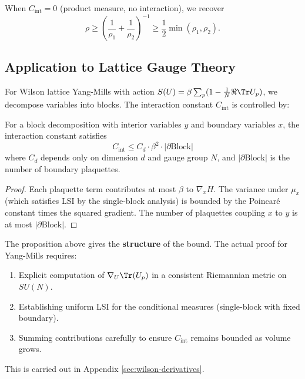 \begin{corollary}
When $C_{\mathrm{int}} = 0$ (product measure, no interaction), we recover
\begin{equation}
    \rho \geq \left( \frac{1}{\rho_1} + \frac{1}{\rho_2} \right)^{-1} \geq \frac{1}{2} \min(\rho_1, \rho_2).
\end{equation}
\end{corollary}

\subsection{Application to Lattice Gauge Theory}

For Wilson lattice Yang-Mills with action $S(U) = \beta \sum_p (1 - \frac{1}{N} \Re \Tr U_p)$, we decompose variables into blocks. The interaction constant $C_{\mathrm{int}}$ is controlled by:

\begin{proposition}\label{prop:ym-interaction}
For a block decomposition with interior variables $y$ and boundary variables $x$, the interaction constant satisfies
\begin{equation}
    C_{\mathrm{int}} \leq C_d \cdot \beta^2 \cdot |\partial \text{Block}|
\end{equation}
where $C_d$ depends only on dimension $d$ and gauge group $N$, and $|\partial \text{Block}|$ is the number of boundary plaquettes.
\end{proposition}

\begin{proof}
Each plaquette term contributes at most $\beta$ to $\nabla_x H$. The variance under $\mu_x$ (which satisfies LSI by the single-block analysis) is bounded by the Poincar\'e constant times the squared gradient. The number of plaquettes coupling $x$ to $y$ is at most $|\partial \text{Block}|$.
\end{proof}

\begin{remark}
The proposition above gives the \textbf{structure} of the bound. The actual proof for Yang-Mills requires:
\begin{enumerate}
    \item Explicit computation of $\nabla_U \Tr(U_p)$ in a consistent Riemannian metric on $SU(N)$.
    \item Establishing uniform LSI for the conditional measures (single-block with fixed boundary).
    \item Summing contributions carefully to ensure $C_{\mathrm{int}}$ remains bounded as volume grows.
\end{enumerate}
This is carried out in Appendix \ref{sec:wilson-derivatives}.
\end{remark}



